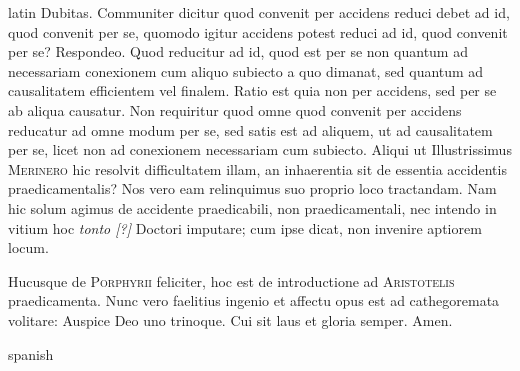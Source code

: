 \begin{otherlanguage*}{latin}
\pstart
Dubitas. Communiter dicitur quod convenit per accidens reduci debet ad id, quod convenit per se, quomodo igitur accidens potest reduci ad id, quod convenit per se? Respondeo. Quod reducitur ad id, quod est per se non quantum ad necessariam conexionem cum aliquo subiecto a quo dimanat, sed quantum ad causalitatem efficientem vel finalem. Ratio est quia non per accidens, sed per se ab aliqua causatur. Non requiritur quod omne quod convenit per accidens reducatur ad omne modum per se, sed satis est ad aliquem, ut ad causalitatem per se, licet non ad conexionem necessariam cum subiecto. Aliqui ut Illustrissimus \textsc{Merinero}\index[persons]{} hic resolvit difficultatem illam, an inhaerentia sit de essentia accidentis praedicamentalis? Nos vero eam relinquimus suo proprio loco tractandam. Nam hic solum agimus de accidente praedicabili, non praedicamentali, nec intendo in vitium hoc \emph{tonto [?]} Doctori imputare; cum ipse dicat, non invenire aptiorem locum. 
\pend

\pstart
Hucusque de  \textsc{Porphyrii} feliciter, hoc est de introductione ad \textsc{Aristotelis} praedicamenta. Nunc vero faelitius ingenio et affectu opus est ad cathegoremata volitare:
Auspice Deo uno trinoque. Cui sit laus et gloria semper. Amen. 
\pend


\endnumbering
\end{otherlanguage*}


\cleardoublepage
\nocite{*}
\begin{otherlanguage*}{spanish}
\printbibliography
\end{otherlanguage*}


\cleardoublepage
\printindex[persons]



